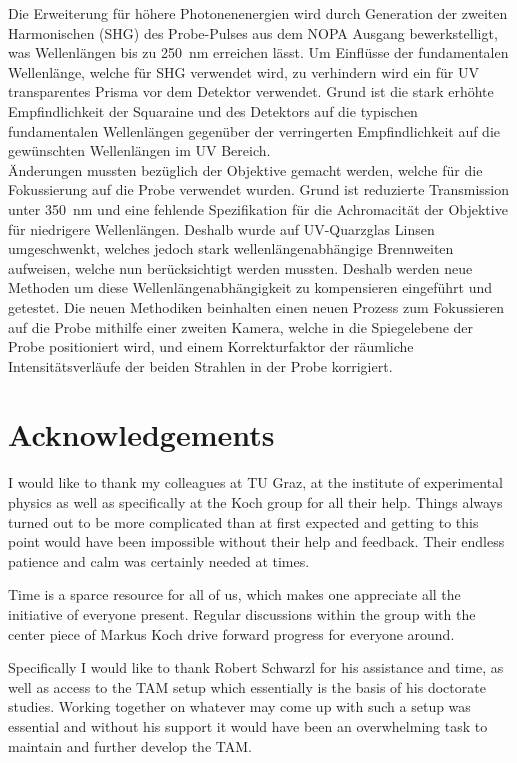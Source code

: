 \documentclass[twoside,openright,listof=numbered]{scrreprt}
\begin{document}
Die Erweiterung für höhere Photonenenergien wird durch Generation der zweiten Harmonischen (SHG) des Probe-Pulses aus dem NOPA Ausgang bewerkstelligt, was Wellenlängen bis zu \qty{250}{\nano\meter} erreichen lässt. Um Einflüsse der fundamentalen Wellenlänge, welche für SHG verwendet wird, zu verhindern wird ein für UV transparentes Prisma vor dem Detektor verwendet. Grund ist die stark erhöhte Empfindlichkeit der Squaraine und des Detektors auf die typischen fundamentalen Wellenlängen gegenüber der verringerten Empfindlichkeit auf die gewünschten Wellenlängen im UV Bereich.\\
Änderungen mussten bezüglich der Objektive gemacht werden, welche für die Fokussierung auf die Probe verwendet wurden. Grund ist reduzierte Transmission unter \qty{350}{\nano\meter} und eine fehlende Spezifikation für die Achromacität der Objektive für niedrigere Wellenlängen. Deshalb wurde auf UV-Quarzglas Linsen umgeschwenkt, welches jedoch stark wellenlängenabhängige Brennweiten aufweisen, welche nun berücksichtigt werden mussten. Deshalb werden neue Methoden um diese Wellenlängenabhängigkeit zu kompensieren eingeführt und getestet. Die neuen Methodiken beinhalten einen neuen Prozess zum Fokussieren auf die Probe mithilfe einer zweiten Kamera, welche in die Spiegelebene der Probe positioniert wird, und einem Korrekturfaktor der räumliche Intensitätsverläufe der beiden Strahlen in der Probe korrigiert.
\chapter*{Acknowledgements}
I would like to thank my colleagues at TU Graz, at the institute of experimental physics as well as specifically at the Koch group for all their help. Things always turned out to be more complicated than at first expected and getting to this point would have been impossible without their help and feedback. Their endless patience and calm was certainly needed at times. 

Time is a sparce resource for all of us, which makes one appreciate all the initiative of everyone present. Regular discussions within the group with the center piece of Markus Koch drive forward progress for everyone around.

Specifically I would like to thank Robert Schwarzl for his assistance and time, as well as access to the TAM setup which essentially is the basis of his doctorate studies. Working together on whatever may come up with such a setup was essential and without his support it would have been an overwhelming task to maintain and further develop the TAM.
\end{document}
